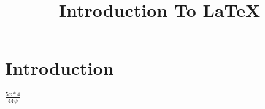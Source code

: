\documentclass[options]{article}
\title{Introduction To LaTeX}
\begin{document}
\section{Introduction}

$ \frac{5x*4}{44\psi} $
\end{document}
